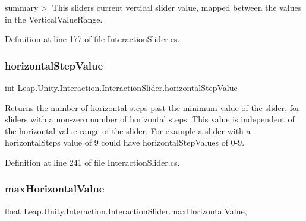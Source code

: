 summary$>$ This slider\textquotesingle{}s current vertical slider value, mapped between the values in the Vertical\+Value\+Range. 



Definition at line 177 of file Interaction\+Slider.\+cs.

\mbox{\label{class_leap_1_1_unity_1_1_interaction_1_1_interaction_slider_ad187d79e89f3bd2784d9021c2de30238}} 
\subsubsection{\texorpdfstring{horizontalStepValue}{horizontalStepValue}}
{\footnotesize\ttfamily int Leap.\+Unity.\+Interaction.\+Interaction\+Slider.\+horizontal\+Step\+Value\hspace{0.3cm}{\ttfamily [get]}}



Returns the number of horizontal steps past the minimum value of the slider, for sliders with a non-\/zero number of horizontal steps. This value is independent of the horizontal value range of the slider. For example a slider with a horizontal\+Steps value of 9 could have horizontal\+Step\+Values of 0-\/9. 



Definition at line 241 of file Interaction\+Slider.\+cs.

\mbox{\label{class_leap_1_1_unity_1_1_interaction_1_1_interaction_slider_a1ff30cd526fda7b40abe4f0272516b26}} 
\subsubsection{\texorpdfstring{maxHorizontalValue}{maxHorizontalValue}}
{\footnotesize\ttfamily float Leap.\+Unity.\+Interaction.\+Interaction\+Slider.\+max\+Horizontal\+Value\hspace{0.3cm}{\ttfamily [get]}, {\ttfamily [set]}}



